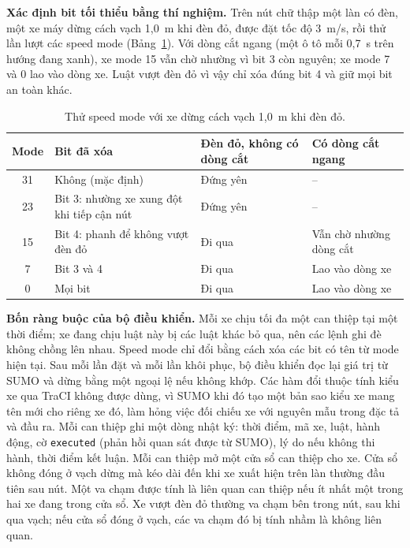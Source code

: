 \documentclass[../main.tex]{subfiles}
\begin{document}
\textbf{Xác định bit tối thiểu bằng thí nghiệm.} Trên nút chữ thập một làn có đèn, một xe máy dừng cách vạch 1,0~m khi đèn đỏ, được đặt tốc độ 3~m/s, rồi thử lần lượt các speed mode (Bảng~\ref{table:5.1}). Với dòng cắt ngang (một ô tô mỗi 0,7~s trên hướng đang xanh), xe mode 15 vẫn chờ nhường vì bit 3 còn nguyên; xe mode 7 và 0 lao vào dòng xe. Luật vượt đèn đỏ vì vậy chỉ xóa đúng bit 4 và giữ mọi bit an toàn khác.

\begin{table}[ht]
\centering
\small
\caption{Thử speed mode với xe dừng cách vạch 1,0~m khi đèn đỏ.} \label{table:5.1}
\begin{tabular}{|c|p{5.8cm}|p{2.6cm}|p{3.4cm}|}
\hline
\textbf{Mode} & \textbf{Bit đã xóa} & \textbf{Đèn đỏ, không có dòng cắt} & \textbf{Có dòng cắt ngang} \\ \hline
31 & Không (mặc định) & Đứng yên & -- \\ \hline
23 & Bit 3: nhường xe xung đột khi tiếp cận nút & Đứng yên & -- \\ \hline
15 & Bit 4: phanh để không vượt đèn đỏ & Đi qua & Vẫn chờ nhường dòng cắt \\ \hline
7 & Bit 3 và 4 & Đi qua & Lao vào dòng xe \\ \hline
0 & Mọi bit & Đi qua & Lao vào dòng xe \\ \hline
\end{tabular}
\end{table}

\textbf{Bốn ràng buộc của bộ điều khiển.} Mỗi xe chịu tối đa một can thiệp tại một thời điểm; xe đang chịu luật này bị các luật khác bỏ qua, nên các lệnh ghi đè không chồng lên nhau. Speed mode chỉ đổi bằng cách xóa các bit có tên từ mode hiện tại. Sau mỗi lần đặt và mỗi lần khôi phục, bộ điều khiển đọc lại giá trị từ SUMO và dừng bằng một ngoại lệ nếu không khớp. Các hàm đổi thuộc tính kiểu xe qua TraCI không được dùng, vì SUMO khi đó tạo một bản sao kiểu xe mang tên mới cho riêng xe đó, làm hỏng việc đối chiếu xe với nguyên mẫu trong đặc tả và đầu ra. Mỗi can thiệp ghi một dòng nhật ký: thời điểm, mã xe, luật, hành động, cờ \texttt{executed} (phản hồi quan sát được từ SUMO), lý do nếu không thi hành, thời điểm kết luận. Mỗi can thiệp mở một cửa sổ can thiệp cho xe. Cửa sổ không đóng ở vạch dừng mà kéo dài đến khi xe xuất hiện trên làn thường đầu tiên sau nút. Một va chạm được tính là liên quan can thiệp nếu ít nhất một trong hai xe đang trong cửa sổ. Xe vượt đèn đỏ thường va chạm bên trong nút, sau khi qua vạch; nếu cửa sổ đóng ở vạch, các va chạm đó bị tính nhầm là không liên quan.
\end{document}

